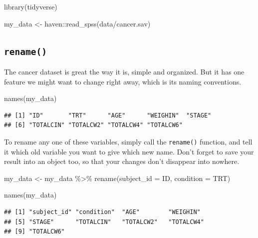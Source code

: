 \documentclass[
]{book}
\newenvironment{Shaded}{\begin{snugshade}}{\end{snugshade}}
\newcommand{\AttributeTok}[1]{\textcolor[rgb]{0.77,0.63,0.00}{#1}}
\newcommand{\FunctionTok}[1]{\textcolor[rgb]{0.00,0.00,0.00}{#1}}
\newcommand{\NormalTok}[1]{#1}
\newcommand{\OtherTok}[1]{\textcolor[rgb]{0.56,0.35,0.01}{#1}}
\newcommand{\SpecialCharTok}[1]{\textcolor[rgb]{0.00,0.00,0.00}{#1}}
\newcommand{\StringTok}[1]{\textcolor[rgb]{0.31,0.60,0.02}{#1}}
\begin{document}
\begin{Shaded}
\begin{Highlighting}[]
\FunctionTok{library}\NormalTok{(tidyverse)}

\NormalTok{my\_data }\OtherTok{\textless{}{-}}\NormalTok{ haven}\SpecialCharTok{::}\FunctionTok{read\_spss}\NormalTok{(}\StringTok{\textquotesingle{}data/cancer.sav\textquotesingle{}}\NormalTok{)}
\end{Highlighting}
\end{Shaded}

\hypertarget{rename}{%
\subsection{\texorpdfstring{\texttt{rename()}}{rename()}}\label{rename}}

The cancer dataset is great the way it is, simple and organized. But it has one feature we might want to change right away, which is its naming conventions.

\begin{Shaded}
\begin{Highlighting}[]
\FunctionTok{names}\NormalTok{(my\_data)}
\end{Highlighting}
\end{Shaded}

\begin{verbatim}
## [1] "ID"       "TRT"      "AGE"      "WEIGHIN"  "STAGE"   
## [6] "TOTALCIN" "TOTALCW2" "TOTALCW4" "TOTALCW6"
\end{verbatim}

To rename any one of these variables, simply call the \texttt{rename()} function, and tell it which old variable you want to give which new name. Don't forget to save your result into an object too, so that your changes don't disappear into nowhere.

\begin{Shaded}
\begin{Highlighting}[]
\NormalTok{my\_data }\OtherTok{\textless{}{-}}\NormalTok{ my\_data }\SpecialCharTok{\%\textgreater{}\%} 
  \FunctionTok{rename}\NormalTok{(}\AttributeTok{subject\_id =}\NormalTok{ ID, }\AttributeTok{condition =}\NormalTok{ TRT)}

\FunctionTok{names}\NormalTok{(my\_data)}
\end{Highlighting}
\end{Shaded}

\begin{verbatim}
## [1] "subject_id" "condition"  "AGE"        "WEIGHIN"   
## [5] "STAGE"      "TOTALCIN"   "TOTALCW2"   "TOTALCW4"  
## [9] "TOTALCW6"
\end{verbatim}
\end{document}

